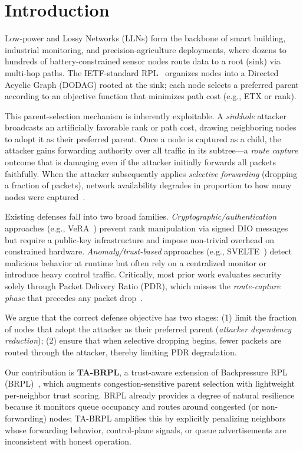 \documentclass[conference]{IEEEtran}
\begin{document}
\section{Introduction}
\label{sec:intro}

Low-power and Lossy Networks (LLNs) form the backbone of smart building,
industrial monitoring, and precision-agriculture deployments,
where dozens to hundreds of battery-constrained sensor nodes
route data to a root (sink) via multi-hop paths.
The IETF-standard RPL~\cite{rfc6550} organizes nodes into a
Directed Acyclic Graph (DODAG) rooted at the sink;
each node selects a preferred parent according to an objective function
that minimizes path cost (e.g., ETX or rank).

This parent-selection mechanism is inherently exploitable.
A \emph{sinkhole} attacker broadcasts an artificially favorable rank or
path cost, drawing neighboring nodes to adopt it as their preferred parent.
Once a node is captured as a child, the attacker gains forwarding authority over
all traffic in its subtree---a \emph{route capture} outcome that is damaging
even if the attacker initially forwards all packets faithfully.
When the attacker subsequently applies \emph{selective forwarding} (dropping
a fraction of packets), network availability degrades in proportion to
how many nodes were captured~\cite{karlof2003,secrpl}.

Existing defenses fall into two broad families.
\emph{Cryptographic/authentication} approaches (e.g., VeRA~\cite{dvir2011})
prevent rank manipulation via signed DIO messages but require a
public-key infrastructure and impose non-trivial overhead on constrained hardware.
\emph{Anomaly/trust-based} approaches (e.g., SVELTE~\cite{raza2013})
detect malicious behavior at runtime but often rely on a centralized
monitor or introduce heavy control traffic.
Critically, most prior work evaluates security solely through
Packet Delivery Ratio (PDR), which misses the \emph{route-capture phase}
that precedes any packet drop~\cite{secrpl}.

We argue that the correct defense objective has two stages:
(1) limit the fraction of nodes that adopt the attacker as their
preferred parent (\emph{attacker dependency reduction});
(2) ensure that when selective dropping begins,
fewer packets are routed through the attacker, thereby limiting PDR degradation.

Our contribution is \textbf{TA-BRPL}, a trust-aware extension of
Backpressure RPL (BRPL)~\cite{brpl},
which augments congestion-sensitive parent selection with lightweight
per-neighbor trust scoring.
BRPL already provides a degree of natural resilience because it monitors
queue occupancy and routes around congested (or non-forwarding) nodes;
TA-BRPL amplifies this by explicitly penalizing neighbors whose
forwarding behavior, control-plane signals, or queue advertisements
are inconsistent with honest operation.
\end{document}
